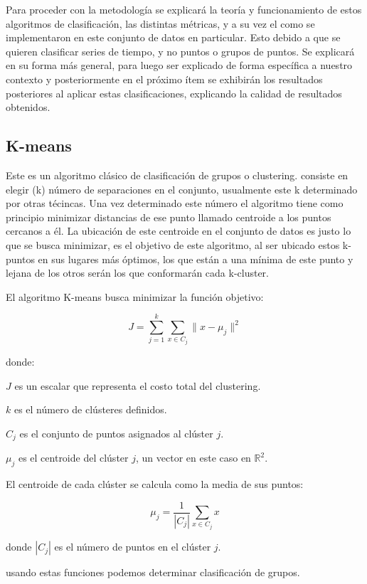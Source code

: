 \documentclass[12pt,a4paper]{article}
\begin{document}
    Para proceder con la metodología se explicará la teoría y funcionamiento de estos algoritmos de clasificación, las distintas métricas, y a su vez el 
    como se implementaron en este conjunto de datos en particular. Esto debido a que se quieren clasificar series de tiempo, y no 
    puntos o grupos de puntos. Se explicará en su forma más general, para luego ser explicado de forma específica a nuestro contexto 
    y posteriormente en el próximo ítem se exhibirán los resultados posteriores al aplicar estas
    clasificaciones, explicando la calidad de resultados obtenidos.

    \subsection{K-means} 
    
    Este es un algoritmo clásico de clasificación de grupos o clustering.
    consiste en elegir (k) número de separaciones en el conjunto, usualmente
    este k determinado por otras técincas. Una vez determinado este número 
    el algoritmo tiene como principio
    minimizar distancias de ese punto llamado centroide a los puntos cercanos 
    a él. La ubicación de este
    centroide en el conjunto de datos es justo lo que se busca minimizar, 
    es el objetivo de este algoritmo,
    al ser ubicado estos k-puntos en sus lugares más óptimos, los que están 
    a una mínima de este punto y lejana de los otros 
     serán los que conformarán cada k-cluster.

    El algoritmo K-means busca minimizar la función objetivo:

\[
J = \sum_{j=1}^{k} \sum_{x \in C_j} \| x - \mu_j \|^2
\]

donde:

$J$ es un escalar que representa el costo total del clustering. 

$k$ es el número de clústeres definidos.

$C_j$ es el conjunto de puntos asignados al clúster $j$.

$\mu_j$ es el centroide del clúster $j$, un vector en este caso en  $\mathbb{R}^2$.

El centroide de cada clúster se calcula como la media de sus puntos:

\[
\mu_j = \frac{1}{|C_j|} \sum_{x \in C_j} x
\]

donde $|C_j|$ es el número de puntos en el clúster $j$.

usando estas funciones podemos determinar clasificación de grupos.
\end{document}
